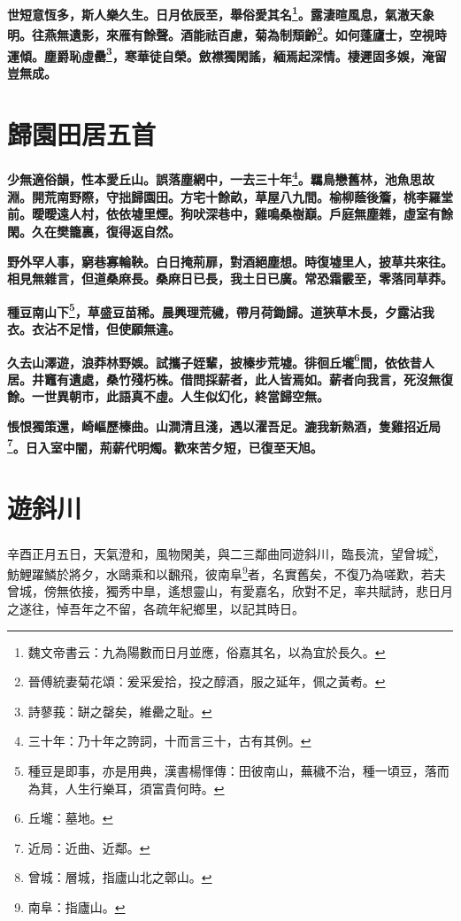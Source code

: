\textbf{世短意恆多，斯人樂久生。日月依辰至，舉俗愛其名\footnote{魏文帝書云：九為陽數而日月並應，俗嘉其名，以為宜於長久。}。露淒暄風息，氣澈天象明。往燕無遺影，來雁有餘聲。酒能祛百慮，菊為制頹齡\footnote{晉傅統妻菊花頌：爰采爰拾，投之醇酒，服之延年，佩之黃耇。}。如何蓬廬士，空視時運傾。塵爵恥虛罍\footnote{詩蓼莪：缾之罄矣，維罍之耻。}，寒華徒自榮。斂襟獨閑謠，緬焉起深情。棲遲固多娛，淹留豈無成。}

\section{歸園田居五首}

\textbf{少無適俗韻，性本愛丘山。誤落塵網中，一去三十年\footnote{三十年：乃十年之誇詞，十而言三十，古有其例。}。羈鳥戀舊林，池魚思故淵。開荒南野際，守拙歸園田。方宅十餘畝，草屋八九間。榆柳蔭後簷，桃李羅堂前。曖曖遠人村，依依墟里煙。狗吠深巷中，雞鳴桑樹巔。戶庭無塵雜，虛室有餘閑。久在樊籠裏，復得返自然。}

\textbf{野外罕人事，窮巷寡輪鞅。白日掩荊扉，對酒絕塵想。時復墟里人，披草共來往。相見無雜言，但道桑麻長。桑麻日已長，我土日已廣。常恐霜霰至，零落同草莽。}

\textbf{種豆南山下\footnote{種豆是即事，亦是用典，漢書楊惲傳：田彼南山，蕪穢不治，種一頃豆，落而為萁，人生行樂耳，須富貴何時。}，草盛豆苗稀。晨興理荒穢，帶月荷鋤歸。道狹草木長，夕露沾我衣。衣沾不足惜，但使願無違。}

\textbf{久去山澤遊，浪莽林野娛。試攜子姪輩，披榛步荒墟。徘徊丘壠\footnote{丘壠：墓地。}間，依依昔人居。井竈有遺處，桑竹殘朽株。借問採薪者，此人皆焉如。薪者向我言，死沒無復餘。一世異朝市，此語真不虛。人生似幻化，終當歸空無。}

\textbf{悵恨獨策還，崎嶇歷榛曲。山澗清且淺，遇以濯吾足。漉我新熟酒，隻雞招近局\footnote{近局：近曲、近鄰。}。日入室中闇，荊薪代明燭。歡來苦夕短，已復至天旭。}

\section{遊斜川\hspace{1ex}{\footnotesize 并序}}

\begin{quoting}辛酉正月五日，天氣澄和，風物閑美，與二三鄰曲同遊斜川，臨長流，望曾城\footnote{曾城：層城，指廬山北之鄣山。}，魴鯉躍鱗於將夕，水鷗乘和以飜飛，彼南阜\footnote{南阜：指廬山。}者，名實舊矣，不復乃為嗟歎，若夫曾城，傍無依接，獨秀中臯，遙想靈山，有愛嘉名，欣對不足，率共賦詩，悲日月之遂往，悼吾年之不留，各疏年紀鄉里，以記其時日。\end{quoting}

